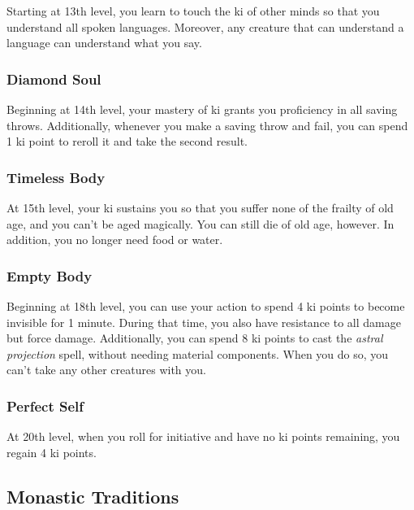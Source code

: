 \documentclass[
]{article}
\begin{document}
Starting at 13th level, you learn to touch the ki of other minds so that
you understand all spoken languages. Moreover, any creature that can
understand a language can understand what you say.

\hypertarget{diamond-soul}{%
\subsubsection{Diamond Soul}\label{diamond-soul}}

Beginning at 14th level, your mastery of ki grants you proficiency in
all saving throws. Additionally, whenever you make a saving throw and
fail, you can spend 1 ki point to reroll it and take the second result.

\hypertarget{timeless-body}{%
\subsubsection{Timeless Body}\label{timeless-body}}

At 15th level, your ki sustains you so that you suffer none of the
frailty of old age, and you can't be aged magically. You can still die
of old age, however. In addition, you no longer need food or water.

\hypertarget{empty-body}{%
\subsubsection{Empty Body}\label{empty-body}}

Beginning at 18th level, you can use your action to spend 4 ki points to
become invisible for 1 minute. During that time, you also have
resistance to all damage but force damage. Additionally, you can spend 8
ki points to cast the \emph{astral projection} spell, without needing
material components. When you do so, you can't take any other creatures
with you.

\hypertarget{perfect-self}{%
\subsubsection{Perfect Self}\label{perfect-self}}

At 20th level, when you roll for initiative and have no ki points
remaining, you regain 4 ki points.

\hypertarget{monastic-traditions}{%
\subsection{Monastic Traditions}\label{monastic-traditions}}
\end{document}

